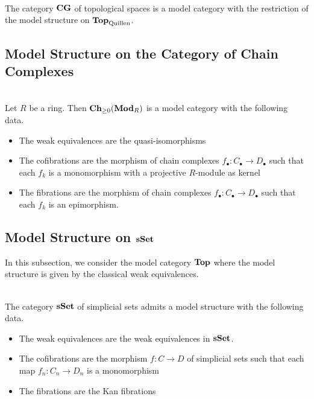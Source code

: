 \documentclass[a4paper]{article}
\begin{document}
\begin{thm}{}{}\\ The category $\bold{CG}$ of topological spaces is a model category with the restriction of the model structure on $\bold{Top}_\text{Quillen}$. 
\end{thm}


\subsection{Model Structure on the Category of Chain Complexes}
\begin{thm}{}{}\\ Let $R$ be a ring. Then $\bold{Ch}_{\geq 0}(\bold{Mod}_R)$ is a model category with the following data. 
\begin{itemize}
\item The weak equivalences are the quasi-isomorphisms
\item The cofibrations are the morphism of chain complexes $f_\bullet:C_\bullet\to D_\bullet$ such that each $f_k$ is a monomorphism with a projective $R$-module as kernel
\item The fibrations are the morphism of chain complexes $f_\bullet:C_\bullet\to D_\bullet$ such that each $f_k$ is an epimorphism. 
\end{itemize}
\end{thm}

\subsection{Model Structure on $\bold{sSet}$}
In this subsection, we consider the model category $\bold{Top}$ where the model structure is given by the classical weak equivalences. 

\begin{thm}{}{}\\ The category $\bold{sSet}$ of simplicial sets admits a model structure with the following data. 
\begin{itemize}
\item The weak equivalences are the weak equivalences in $\bold{sSet}$. 
\item The cofibrations are the morphism $f:C\to D$ of simplicial sets such that each map $f_n:C_n\to D_n$ is a monomorphism
\item The fibrations are the Kan fibrations
\end{itemize}
\end{thm}
\end{document}
